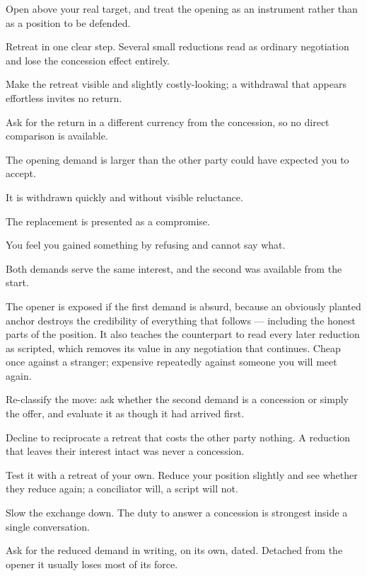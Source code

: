 \begin{application}
  \item Open above your real target, and treat the opening as an instrument rather than as a position to be defended.
  \item Retreat in one clear step. Several small reductions read as ordinary negotiation and lose the concession effect entirely.
  \item Make the retreat visible and slightly costly-looking; a withdrawal that appears effortless invites no return.
  \item Ask for the return in a different currency from the concession, so no direct comparison is available.
\end{application}

\begin{feedback}
  \item The opening demand is larger than the other party could have expected you to accept.
  \item It is withdrawn quickly and without visible reluctance.
  \item The replacement is presented as a compromise.
  \item You feel you gained something by refusing and cannot say what.
  \item Both demands serve the same interest, and the second was available from the start.
\end{feedback}

\begin{failure}
The opener is exposed if the first demand is absurd, because an obviously planted anchor destroys the credibility of everything that follows --- including the honest parts of the position. It also teaches the counterpart to read every later reduction as scripted, which removes its value in any negotiation that continues. Cheap once against a stranger; expensive repeatedly against someone you will meet again.
\end{failure}

\begin{countermeasures}
  \item Re-classify the move: ask whether the second demand is a concession or simply the offer, and evaluate it as though it had arrived first.
  \item Decline to reciprocate a retreat that costs the other party nothing. A reduction that leaves their interest intact was never a concession.
  \item Test it with a retreat of your own. Reduce your position slightly and see whether they reduce again; a conciliator will, a script will not.
  \item Slow the exchange down. The duty to answer a concession is strongest inside a single conversation.
  \item Ask for the reduced demand in writing, on its own, dated. Detached from the opener it usually loses most of its force.
\end{countermeasures}

\seesources
{}
